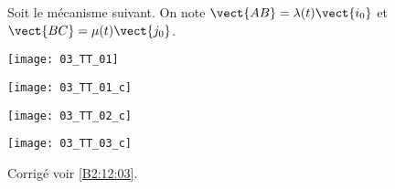 \normaltrue
\correctiontrue



\setcounter{question}{0}
\ifcorrection
\else
{}
\fi

\ifprof
\else
Soit le mécanisme suivant. On note $\vect{AB}=\lambda(t)\vect{i_0}$ et $\vect{BC}=\mu(t)\vect{j_0}$.
\begin{center}
\texttt{[image: 03\_TT\_01]}
\end{center}
\fi

\ifprof
\begin{multicols}{3}
\else
\fi
{}
\ifprof
\begin{center}
\texttt{[image: 03\_TT\_01\_c]}
\end{center}
\else
\fi

\ifprof
\begin{center}
\texttt{[image: 03\_TT\_02\_c]}
\end{center}
\else
\fi

\ifprof
\begin{center}
\texttt{[image: 03\_TT\_03\_c]}
\end{center}
\else
\fi


\ifprof
\end{multicols}
\else
\fi

\ifprof
\else
\begin{flushright}
\footnotesize{Corrigé  voir \ref{B2:12:03}.}
\end{flushright}%
\fi


